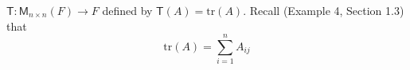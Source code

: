 $\mathsf{T}\colon\mathsf{M}_{n\times n}(F) \to F$ defined by
$\mathsf{T}(A) = \text{tr}(A)$. Recall (Example 4, Section 1.3) that
\[
\text{tr}(A) = \sum\limits_{i=1}^n A_{ij}
\]
